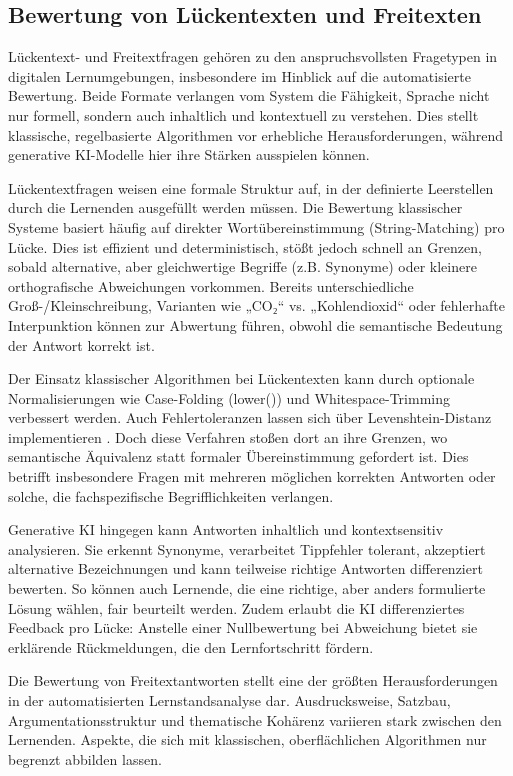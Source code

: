 \documentclass[a4paper,12pt]{article}
\begin{document}
\subsection{Bewertung von Lückentexten und Freitexten}
Lückentext- und Freitextfragen gehören zu den anspruchsvollsten Fragetypen in digitalen Lernumgebungen, insbesondere im Hinblick auf die automatisierte Bewertung. Beide Formate verlangen vom System die Fähigkeit, Sprache nicht nur formell, sondern auch inhaltlich und kontextuell zu verstehen. Dies stellt klassische, regelbasierte Algorithmen vor erhebliche Herausforderungen, während generative KI-Modelle hier ihre Stärken ausspielen können.

Lückentextfragen weisen eine formale Struktur auf, in der definierte Leerstellen durch die Lernenden ausgefüllt werden müssen. Die Bewertung klassischer Systeme basiert häufig auf direkter Wortübereinstimmung (String-Matching) pro Lücke. Dies ist effizient und deterministisch, stößt jedoch schnell an Grenzen, sobald alternative, aber gleichwertige Begriffe (z.B. Synonyme) oder kleinere orthografische Abweichungen vorkommen. Bereits unterschiedliche Groß-/Kleinschreibung, Varianten wie „CO₂“ vs. „Kohlendioxid“ oder fehlerhafte Interpunktion können zur Abwertung führen, obwohl die semantische Bedeutung der Antwort korrekt ist.

Der Einsatz klassischer Algorithmen bei Lückentexten kann durch optionale Normalisierungen wie Case-Folding (lower()) und Whitespace-Trimming verbessert werden. Auch Fehlertoleranzen lassen sich über Levenshtein-Distanz implementieren \parencite{jurafsky}. Doch diese Verfahren stoßen dort an ihre Grenzen, wo semantische Äquivalenz statt formaler Übereinstimmung gefordert ist. Dies betrifft insbesondere Fragen mit mehreren möglichen korrekten Antworten oder solche, die fachspezifische Begrifflichkeiten verlangen.

Generative KI hingegen kann Antworten inhaltlich und kontextsensitiv analysieren. Sie erkennt Synonyme, verarbeitet Tippfehler tolerant, akzeptiert alternative Bezeichnungen und kann teilweise richtige Antworten differenziert bewerten. So können auch Lernende, die eine richtige, aber anders formulierte Lösung wählen, fair beurteilt werden. Zudem erlaubt die KI differenziertes Feedback pro Lücke: Anstelle einer Nullbewertung bei Abweichung bietet sie erklärende Rückmeldungen, die den Lernfortschritt fördern.

Die Bewertung von Freitextantworten stellt eine der größten Herausforderungen in der automatisierten Lernstandsanalyse dar. Ausdrucksweise, Satzbau, Argumentationsstruktur und thematische Kohärenz variieren stark zwischen den Lernenden. Aspekte, die sich mit klassischen, oberflächlichen Algorithmen nur begrenzt abbilden lassen.
\end{document}
